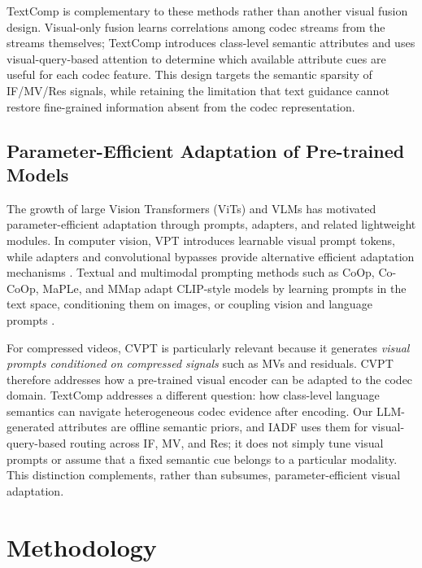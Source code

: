 \documentclass[letterpaper]{article} %
\begin{document}
TextComp is complementary to these methods rather than another visual fusion design. Visual-only fusion learns correlations among codec streams from the streams themselves; TextComp introduces class-level semantic attributes and uses visual-query-based attention to determine which available attribute cues are useful for each codec feature. This design targets the semantic sparsity of IF/MV/Res signals, while retaining the limitation that text guidance cannot restore fine-grained information absent from the codec representation.

\subsection{Parameter-Efficient Adaptation of Pre-trained Models}
\label{subsec:peft_adaptation}
The growth of large Vision Transformers (ViTs) and VLMs \cite{radford2021learning,yuan2021florence} has motivated parameter-efficient adaptation through prompts, adapters, and related lightweight modules. In computer vision, VPT \cite{jia2022visual} introduces learnable visual prompt tokens, while adapters and convolutional bypasses provide alternative efficient adaptation mechanisms \cite{chen2022adaptformer,jie2024convolutional}. Textual and multimodal prompting methods such as CoOp, Co-CoOp, MaPLe, and MMap adapt CLIP-style models by learning prompts in the text space, conditioning them on images, or coupling vision and language prompts \cite{zhou2022learning,zhou2022conditional,khattak2023maple,xin2024mmap}.

For compressed videos, CVPT \cite{li2023compressed} is particularly relevant because it generates \textit{visual prompts conditioned on compressed signals} such as MVs and residuals. CVPT therefore addresses how a pre-trained visual encoder can be adapted to the codec domain. TextComp addresses a different question: how class-level language semantics can navigate heterogeneous codec evidence after encoding. Our LLM-generated attributes are offline semantic priors, and IADF uses them for visual-query-based routing across IF, MV, and Res; it does not simply tune visual prompts or assume that a fixed semantic cue belongs to a particular modality. This distinction complements, rather than subsumes, parameter-efficient visual adaptation.

\section{Methodology}
\label{sec:method}
\end{document}
